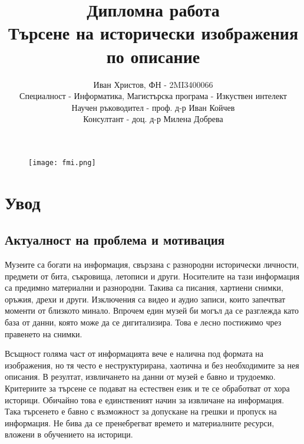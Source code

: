 \documentclass[a4paper,12pt]{article}
\begin{document}
\title{
    Дипломна работа\\
    \large Търсене на исторически изображения по описание}
    \author{
        Иван Христов, ФН - 2MI3400066\\
        Специалност - Информатика, Магистърска програма - Изкуствен интелект\\
        Научен ръководител - проф. д-р Иван Койчев\\
        Консултант - доц. д-р Милена Добрева
    }

\maketitle

\begin{figure}[h]
    \centering
    \texttt{[image: fmi.png]}
    \label{fig:fmi}
\end{figure}

\pagebreak

\tableofcontents
\pagebreak

\section{Увод}

\subsection{Актуалност на проблема и мотивация}

Музеите са богати на информация, свързана с разнородни исторически личности, предмети от бита, съкровища, летописи и други. Носителите на тази информация са предимно материални и разнородни. Такива са писания, хартиени снимки, оръжия, дрехи и други. Изключения са видео и аудио записи, които запечтват моменти от близкото минало. Впрочем един музей би могъл да се разглежда като база от данни, която може да се дигитализира. Това е лесно постижимо чрез правенето на снимки.

\bigbreak

Всъщност голяма част от информацията вече е налична под формата на изображения, но тя често е неструктурирана, хаотична и без необходимите за нея описания. В резултат, извличането на данни от музей е бавно и трудоемко. Критериите за търсене се подават на естествен език и те се обработват от хора историци. Обичайно това е единственият начин за извличане на информация. Така търсенето е бавно с възможност за допускане на грешки и пропуск на информация. Не бива да се пренебрегват времето и материалните ресурси, вложени в обучението на историци.
\end{document}
